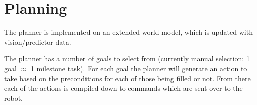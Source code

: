 \section{Planning}
The planner is implemented on an extended world model, which is updated with vision/predictor data.

The planner has a number of goals to select from (currently manual selection: 1 goal $\approx$ 1 milestone task). For each goal the planner will generate an action to take based on the preconditions for each of those being filled or not. From there each of the actions is compiled down to commands which are sent over to the robot.